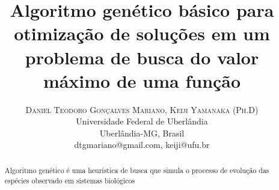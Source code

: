\documentclass[twoside]{article}
\title{\vspace{-15mm}\fontsize{24pt}{10pt}\selectfont\textbf{Algoritmo genético básico para otimização de soluções em um problema de busca do valor máximo de uma função}} %
\author{
\large
\textsc{Daniel Teodoro Gonçalves Mariano, Keiji Yamanaka (Ph.D)}\\[2mm] %
\normalsize Universidade Federal de Uberlândia\\ \normalsize Uberlândia-MG, Brasil \\ %
\normalsize {dtgmariano@gmail.com, keiji@ufu.br} %
\vspace{-5mm}
}
\date{}
\begin{document}
\maketitle %

\thispagestyle{fancy} %



\begin{abstract}
\noindent
Algoritmo genético é uma heurística de busca que simula o processo de evolução das espécies observado em sistemas biológicos
\end{abstract}

\end{document}

